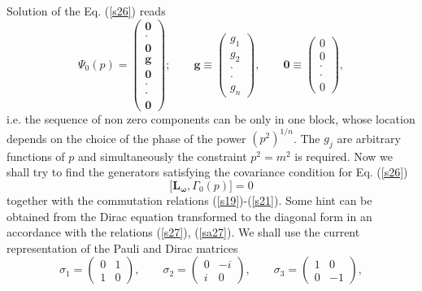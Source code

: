 \documentclass[a4paper,a4paper]{article}
\begin{document}
Solution of the Eq. (\ref{s26}) reads 
\begin{equation}
\Psi _{0}(p)=\left( 
\begin{array}{c}
\mathbf{0} \\ 
\cdot  \\ 
\mathbf{0} \\ 
\mathbf{g} \\ 
\mathbf{0} \\ 
\cdot  \\ 
\cdot  \\ 
\mathbf{0}%
\end{array}%
\right) ;\qquad \mathbf{g}\equiv \left( 
\begin{array}{c}
g_{1} \\ 
g_{2} \\ 
\cdot  \\ 
\cdot  \\ 
g_{n}%
\end{array}%
\right) ,\qquad \mathbf{0}\equiv \left( 
\begin{array}{c}
0 \\ 
0 \\ 
\cdot  \\ 
\cdot  \\ 
0%
\end{array}%
\right) ,  \label{s38}
\end{equation}%
i.e. the sequence of non zero components can be only in one block, whose
location depends on the choice of the phase of the power $(p^{2})^{1/n}$.
The $g_{j}$ are arbitrary functions of $p$ and simultaneously the constraint 
$p^{2}=m^{2}$ is required. Now we shall try to find the generators
satisfying the covariance condition for Eq. (\ref{s26}) 
\begin{equation}
\lbrack \mathbf{L_{\omega }},\Gamma _{0}(p)]=0  \label{s39}
\end{equation}%
together with the commutation relations (\ref{s19})-(\ref{s21}). Some hint
can be obtained from the Dirac equation transformed to the diagonal form in
an accordance with the relations (\ref{s27}), (\ref{sa27}). We shall use the
current representation of the Pauli and Dirac matrices 
\begin{equation}
\sigma _{1}=\left( 
\begin{array}{cc}
0 & 1 \\ 
1 & 0%
\end{array}%
\right) ,\qquad \sigma _{2}=\left( 
\begin{array}{cc}
0 & -i \\ 
i & 0%
\end{array}%
\right) ,\qquad \sigma _{3}=\left( 
\begin{array}{cc}
1 & 0 \\ 
0 & -1%
\end{array}%
\right) ,  \label{s40}
\end{equation}%
\end{document}
